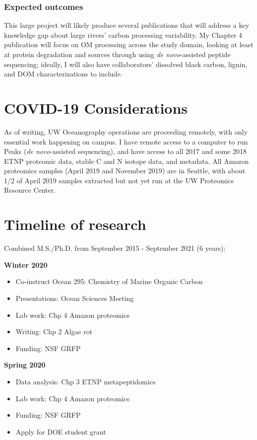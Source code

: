 \documentclass[12pt, letterpaper, twoside]{article}
\begin{document}
\subsubsection*{Expected outcomes}

This large project will likely produce several publications that will address a key knowledge gap about large rivers' carbon processing variability. My Chapter 4 publication will focus on OM processing across the study domain, looking at least at protein degradation and sources through using \textit{de novo}-assisted peptide sequencing; ideally, I will also have collaborators' dissolved black carbon, lignin, and DOM characterizations to include.  

\section{COVID-19 Considerations}

As of writing, UW Oceanography operations are proceeding remotely, with only essential work happening on campus. I have remote access to a computer to run Peaks (\textit{de novo}-assisted sequencing), and have access to all 2017 and some 2018 ETNP proteomic data, stable C and N isotope data, and metadata. All Amazon proteomics samples (April 2019 and November 2019) are in Seattle, with about 1/2 of April 2019 samples extracted but not yet run at the UW Proteomics Resource Center. 

\section{Timeline of research}

Combined M.S./Ph.D. from September 2015 - September 2021 (6 years):

\bigskip

\textbf{Winter 2020}
\begin{itemize}
	\item Co-instruct Ocean 295: Chemistry of Marine Organic Carbon
	\item Presentations: Ocean Sciences Meeting
	\item Lab work: Chp 4 Amazon proteomics
	\item Writing: Chp 2 Algae rot
	\item Funding: NSF GRFP
\end{itemize}

\textbf{Spring 2020}
\begin{itemize}
	\item Data analysis: Chp 3 ETNP metapeptidomics
	\item Lab work: Chp 4 Amazon proteomics
	\item Funding: NSF GRFP
	\item Apply for DOE student grant
\end{itemize}
\end{document}
